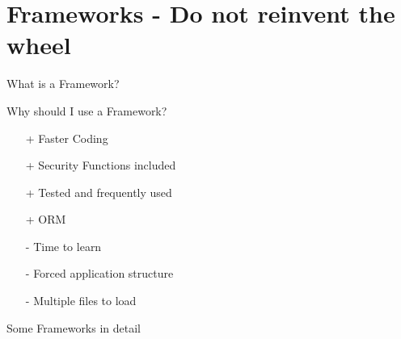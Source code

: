 \section{Frameworks - Do not reinvent the wheel}
\begin{frame}{What is a Framework?}
\end{frame}

\begin{frame}{Why should I use a Framework?}
	\begin{itemize}
		\item[+] Faster Coding
		\item[+] Security Functions included
		\item[+] Tested and frequently used
		\item[+] ORM
	\end{itemize}
	\begin{itemize}
		\item[-] Time to learn
		\item[-] Forced application structure
		\item[-] Multiple files to load
	\end{itemize}
\end{frame}

\begin{frame}{Some Frameworks in detail}
\end{frame}